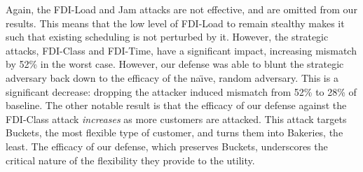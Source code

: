 Again, the FDI-Load and Jam attacks are not effective, and are omitted from our results. This means that the low level of FDI-Load to remain stealthy makes it such that existing scheduling is not perturbed by it. However, the strategic attacks, FDI-Class and FDI-Time, have a significant impact, increasing mismatch by 52\% in the worst case. However, our defense was able to blunt the strategic adversary back down to the efficacy of the na\"\i ve, random adversary. This is a significant decrease: dropping the attacker induced mismatch from 52\% to 28\% of baseline. 
The other notable result is that the efficacy of our defense against the FDI-Class attack \emph{increases} as more customers are attacked. This attack targets Buckets, the most flexible type of customer, and turns them into Bakeries, the least. The efficacy of our defense, which preserves Buckets, underscores the critical nature of the flexibility they provide to the utility. 

